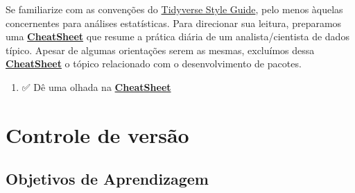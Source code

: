 \documentclass[
  a4paper,
]{book}
\providecommand{\tightlist}{%
  \setlength{\itemsep}{0pt}\setlength{\parskip}{0pt}}\usepackage{longtable,booktabs,array}
\newcommand{\emojitext}[1]{{\emoji #1}}
\begin{document}
\begin{tcolorbox}
Se familiarize com as convenções do
\href{https://style.tidyverse.org/}{Tidyverse Style Guide}, pelo menos
àquelas concernentes para análises estatísticas. Para direcionar sua
leitura, preparamos uma
\href{./resources/04-tidyverse_cheatsheet.html}{\textbf{CheatSheet}} que
resume a prática diária de um analista/cientista de dados típico. Apesar
de algumas orientações serem as mesmas, excluímos dessa
\href{./resources/04-tidyverse_cheatsheet.html}{\textbf{CheatSheet}} o
tópico relacionado com o desenvolvimento de pacotes.

\vspace{10pt}

\begin{enumerate}
\def\labelenumi{\arabic{enumi}.}
\setcounter{enumi}{4}
\tightlist
\item
  \emojitext{✅} Dê uma olhada na
  \href{./resources/04-tidyverse_cheatsheet.html}{\textbf{CheatSheet}}
\end{enumerate}

\end{tcolorbox}


\chapter{Controle de versão}\label{sec-git}

\section{Objetivos de Aprendizagem}\label{objetivos-de-aprendizagem-4}
\end{document}
